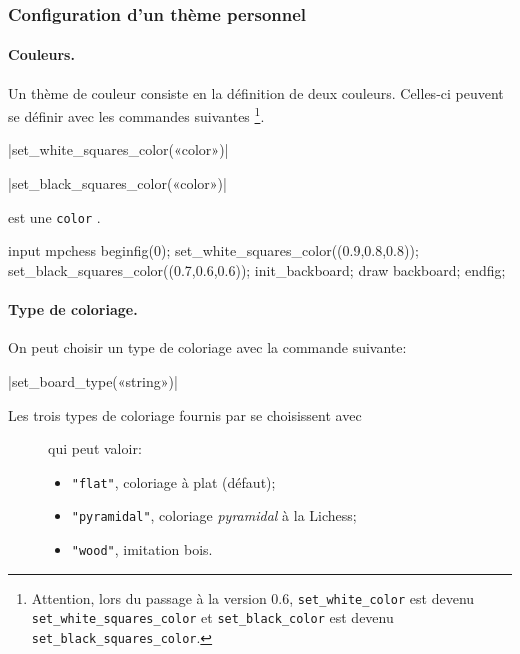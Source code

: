 \documentclass[french]{ltxdoc}
\begin{document}
\subsubsection{Configuration d’un thème personnel}

\paragraph{Couleurs.}
Un thème de couleur consiste en la définition de deux couleurs.
Celles-ci peuvent se définir avec les commandes suivantes \footnote{Attention,
lors du passage à la version 0.6, \lstinline+set_white_color+ est devenu
\lstinline+set_white_squares_color+ et \lstinline+set_black_color+ est devenu
\lstinline+set_black_squares_color+.}.

\commande|set_white_squares_color(«color»)|\par
\commande|set_black_squares_color(«color»)|\smallskip

 est une \lstinline+color+ \MP.

\begin{ExempleMP}
input mpchess
beginfig(0);
set_white_squares_color((0.9,0.8,0.8));
set_black_squares_color((0.7,0.6,0.6));
init_backboard;
draw backboard;
endfig;
\end{ExempleMP}

\paragraph{Type de coloriage.}


On peut choisir un type de coloriage avec la commande suivante:

\commande|set_board_type(«string»)|\smallskip

Les trois types de coloriage fournis par \mpchess{} se choisissent avec 
\begin{description}
  \item[] qui peut valoir:
\begin{itemize}
\item \lstinline+"flat"+,  coloriage à plat (défaut);
\item \lstinline+"pyramidal"+, coloriage \emph{pyramidal} à la Lichess; 
\item \lstinline+"wood"+, imitation bois.
\end{itemize}
\end{description}
\end{document}
